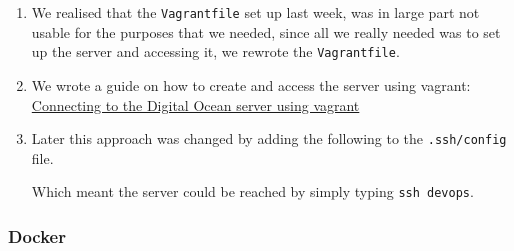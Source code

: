 \begin{enumerate}
    \item We realised that the \texttt{Vagrantfile} set up last week, was in large part not usable for the purposes that we needed, since all we really needed was to set up the server and accessing it, we rewrote the \texttt{Vagrantfile}.
    \item We wrote a guide on how to create and access the server using vagrant: \href{https://www.notion.so/Connecting-to-the-Digital-Ocean-server-using-vagrant-5b8564d3a0fd40bdbc2c326705f1f8dc?pvs=21}{Connecting to the Digital Ocean server using vagrant}
    \item Later this approach was changed by adding the following to the \texttt{.ssh/config} file.

    Which meant the server could be reached by simply typing \texttt{ssh\ devops}.
\end{enumerate}

\subsubsection{Docker}
\label{log:docker}

